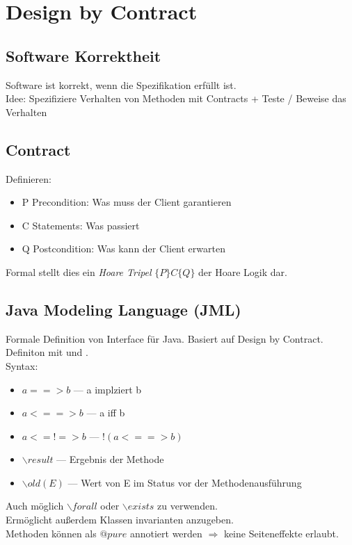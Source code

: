 

\section{Design by Contract}%
\label{dbc:sec:design-by-contract}
\subsection{Software Korrektheit}%
\label{dbc:sub:software-korrektheit}
Software ist korrekt, wenn die Spezifikation erfüllt ist.\\
Idee: Spezifiziere Verhalten von Methoden mit Contracts + Teste / Beweise das Verhalten

\subsection{Contract}%
\label{dbc:sub:contract}
Definieren:
\begin{itemize}
  \item P Precondition: Was muss der Client garantieren
  \item C Statements: Was passiert
  \item Q Postcondition: Was kann der Client erwarten
\end{itemize}
Formal stellt dies ein \textit{Hoare Tripel} \(\{P\} C \{Q\}\) der Hoare Logik dar.

\subsection{Java Modeling Language (JML)}%
\label{dbc:sub:jml}
Formale Definition von Interface für Java. Basiert auf Design by Contract. Definiton mit  und
.\\
Syntax:
\begin{itemize}
  \item \(a ==> b\) --- a implziert b
  \item \(a <==> b\) --- a iff b
  \item \(a <=!=> b\) --- \(!(a<==>b)\)
  \item \(\backslash result\) --- Ergebnis der Methode
  \item \(\backslash old(E)\) --- Wert von E im Status vor der Methodenausführung
\end{itemize}
Auch möglich \(\backslash forall\) oder \(\backslash exists\) zu verwenden.\\
Ermöglicht außerdem Klassen invarianten anzugeben.\\
Methoden können als \(@pure\) annotiert werden \(\Rightarrow\) keine Seiteneffekte erlaubt.

